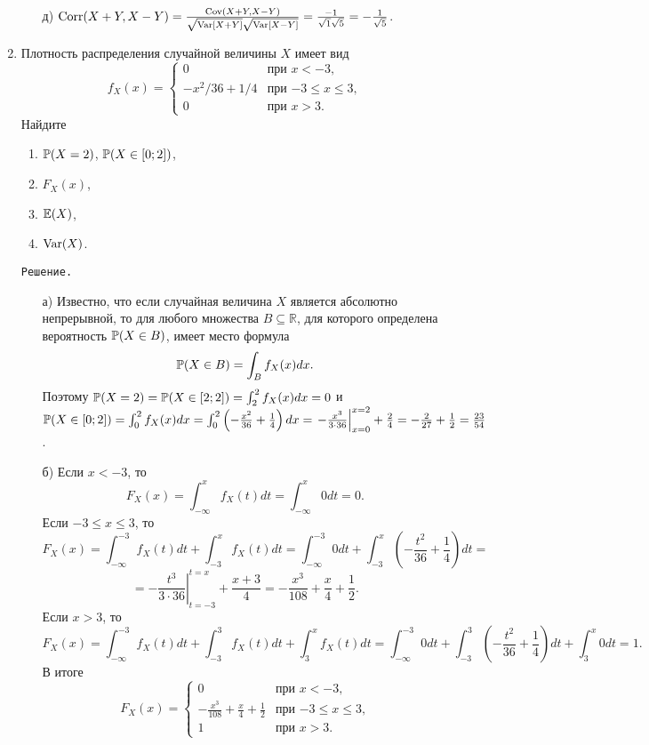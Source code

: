 \begin{enumerate}
\begin{enumerate}
\item[д)] $\Corr(X+Y, X-Y) = \frac{\Cov(X+Y, X-Y)}{\sqrt{\Var[X+Y]}\sqrt{\Var[X-Y]}} = \frac{-1}{\sqrt{1}\sqrt{5}} = -\frac{1}{\sqrt{5}}$.
\end{enumerate}
\item %
Плотность распределения случайной величины $X$ имеет вид
\[
f_X(x) =          \begin{cases}
                     0     &   \text{при $x < -3$,} \\
                     -x^{2}/36 + 1/4   &   \text{при $-3 \leq x \leq 3$,} \\
                     0     &   \text{при $x > 3$.}
                  \end{cases}
\]
Найдите
\begin{enumerate}
  \item $\P(X=2)$, $\P(X \in [0;2])$,
  \item $F_X(x)$,
  \item $\E(X)$,
  \item $\Var(X)$.
\end{enumerate}

\verb"Решение."
\begin{enumerate}
\item[а)] Известно, что если случайная величина $X$ является абсолютно непрерывной, то для любого множества $B \subseteq \mathbb{R}$, для которого определена вероятность $\P(X \in B)$, имеет место формула
\[
\P(X \in B) = \int_{B}f_X(x)dx.
\]
Поэтому $\P(X = 2) = \P(X \in [2;2]) = \int_{2}^{2}f_X(x)dx = 0$ и $\P(X \in [0;2]) = \int_{0}^{2}f_X(x)dx = \int_{0}^{2}\left(-\frac{x^2}{36} + \frac{1}{4}\right)dx = \left.-\frac{x^3}{3\cdot36}\right|_{x=0}^{x=2} + \frac{2}{4} = -\frac{2}{27} + \frac{1}{2} = \frac{23}{54}$.

\item[б)] Если $x < -3$, то
\[
F_X(x) = \int_{-\infty}^{x}f_X(t)dt = \int_{-\infty}^{x}0dt = 0 \text{.}
\]
Если $-3 \leq x \leq 3$, то
\[
F_X(x) = \int_{-\infty}^{-3}f_X(t)dt + \int_{-3}^{x}f_X(t)dt= \int_{-\infty}^{-3}0dt + \int_{-3}^{x}\left(-\frac{t^2}{36} + \frac{1}{4}\right)dt =
\]
\[
= -\left.\frac{t^3}{3\cdot36}\right|_{t=-3}^{t=x} + \frac{x+3}{4} = -\frac{x^3}{108} + \frac{x}{4} + \frac{1}{2} \text{.}
\]
Если $x > 3$, то
\[
F_X(x) = \int_{-\infty}^{-3}f_X(t)dt + \int_{-3}^{3}f_X(t)dt + \int_{3}^{x}f_X(t)dt = \int_{-\infty}^{-3}0dt + \int_{-3}^{3}\left(-\frac{t^2}{36} + \frac{1}{4}\right)dt + \int_{3}^{x}0dt = 1 \text{.}
\]
В итоге
\[
F_X(x) =
                 \begin{cases}
                     0                   &   \text{при $x < -3$,} \\
                     -\frac{x^3}{108} + \frac{x}{4} + \frac{1}{2}   &   \text{при $-3 \leq x \leq 3$,} \\
                     1                   &   \text{при $x > 3$.}
                  \end{cases}
\]


\end{enumerate}
\end{enumerate}
